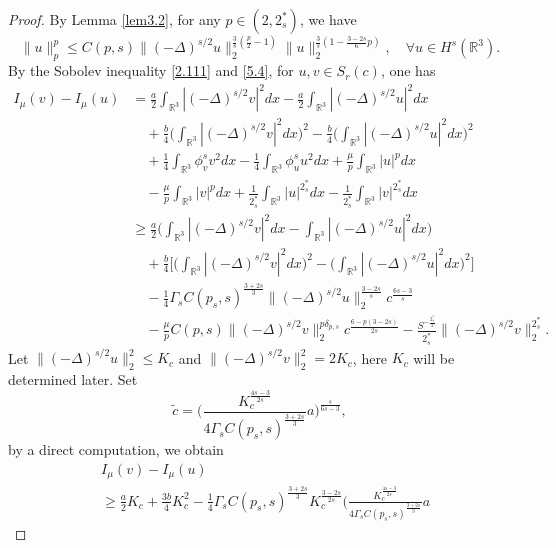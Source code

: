 \documentclass[11pt]{article}
\numberwithin{equation}{section}
\begin{document}
\begin{proof}
By Lemma {\ref{lem3.2}}, for any $p\in(2, 2^*_s)$, we have
 \begin{equation}\label{5.4}
\|u\|^p_p\leq C{(p,s)}\|(-\Delta)^{s/2}u\|^{\frac{3}{s}(\frac{p}{2}-1)}_2
\|u\|^{\frac{3}{s}(1-\frac{3-2s}{6}p)}_2, \quad \forall u\in H^s(\mathbb{R}^3).
\end{equation}
By the Sobolev inequality \eqref{2.111} and \eqref{5.4}, for $u, v\in  S_{r}(c)$, 
one has
\begin{align*} %
I_\mu(v)-I_\mu(u)
&= \frac{a}{2}\int_{\mathbb{R}^3}|(-\Delta)^{s/2}v|^2dx
 -\frac{a}{2}\int_{\mathbb{R}^3}|(-\Delta)^{s/2}u|^2dx\\
&\quad +\frac{b}{4}\Big(\int_{\mathbb{R}^3}|(-\Delta)^{s/2}v|^2dx\Big)^2
 -\frac{b}{4}\Big(\int_{\mathbb{R}^3}|(-\Delta)^{s/2}u|^2dx\Big)^2\\
&\quad +\frac{1}{4}\int_{\mathbb{R}^3}\phi^s_v v^2dx-\frac{1}{4}
 \int_{\mathbb{R}^3}\phi^s_u u^2dx+\frac{\mu}{p}\int_{\mathbb{R}^3}|u|^pdx\\
&\quad -\frac{\mu}{p}\int_{\mathbb{R}^3}|v|^pdx+\frac{1}{2^*_s}\int_{\mathbb{R}^3}|u|^{2^*_s}dx-\frac{1}{2^*_s}\int_{\mathbb{R}^3}|v|^{2^*_s}dx\\
&\geq   \frac{a}{2}\Big(\int_{\mathbb{R}^3}|(-\Delta)^{s/2}v|^2dx
 -\int_{\mathbb{R}^3}|(-\Delta)^{s/2}u|^2dx\Big)\\
&\quad +\frac{b}{4}\Big[\Big(\int_{\mathbb{R}^3}|(-\Delta)^{s/2}v|^2dx\Big)^2
 -\Big(\int_{\mathbb{R}^3}|(-\Delta)^{s/2}u|^2dx\Big)^2\Big]\\
&\quad -\frac{1}{4}\Gamma_sC(p_s, s)^{\frac{3+2s}{3}}\|(-\Delta)^{s/2}u\|^{\frac{3-2s}
{s}}_2c^{\frac{6s-3}{s}}\\
&\quad -\frac{\mu}{p}C(p,s)\|(-\Delta)^{s/2}v\|^{p {\delta_{p,s}}}_2 
 c^{\frac{6-p(3-2s)}{2s}}
 -\frac{S^{-\frac{2^*_s}{2}}}{2^*_s}\|(-\Delta)^{s/2}v\|^{2^*_s}_2.
\end{align*}
Let $\|(-\Delta)^{s/2}u\|^2_2\leq K_c$ and $\|(-\Delta)^{s/2}v\|^2_2=2K_c$, 
here $K_c$ will be determined later. Set
$$
\tilde{c}=\Big(\frac{K_c^{\frac{4s-3}{2s}}}{4\Gamma_s C(p_s, s)^{\frac{3+2s}{3}}}a
 \Big)^{\frac{s}{6s-3}},
$$
by a direct computation, we obtain
\begin{equation}\label{5.6}
\begin{split}
&I_\mu(v)-I_\mu(u) \\
&\geq \frac{a}{2}K_c+\frac{3b}{4}K^2_c-\frac{1}{4}\Gamma_s
  C(p_s, s)^{\frac{3+2s}{3}} K^{\frac{3-2s}{2s}}_c 
  \Big(\frac{K_c^{\frac{4s-3}{2s}}}{4\Gamma_s C(p_s, s)^{\frac{3+2s}{3}}}a

\end{split}
\end{equation}
\end{proof}
\end{document}

